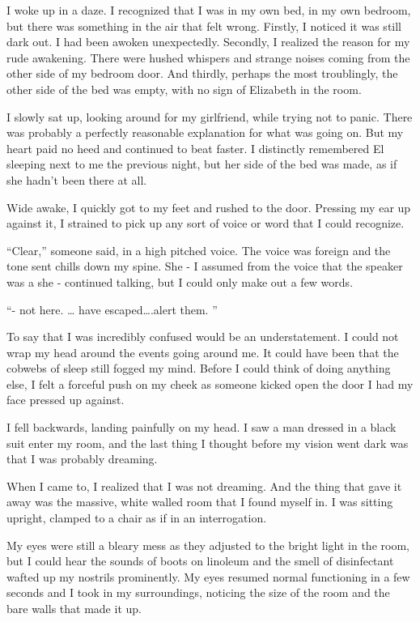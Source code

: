 I woke up in a daze. I recognized that I was in my own bed, in my own bedroom, but there was something  in the air that felt wrong. Firstly, I noticed it was still dark out. I had been awoken unexpectedly. Secondly, I realized the reason for my rude awakening. There were hushed whispers and strange noises coming from the other side of my bedroom door. And thirdly, perhaps the most troublingly, the other side of the bed was empty, with no sign of Elizabeth in the room.

I slowly sat up, looking around for my girlfriend, while trying not to panic. There was probably a perfectly reasonable explanation for what was going on. But my heart paid no heed and continued to beat faster. I distinctly remembered El sleeping next to me the previous night, but her side of the bed was made, as if she hadn’t been there at all. 

Wide awake, I quickly got to my feet and rushed to the door. Pressing my ear up against it, I strained to pick up any sort of voice or word that I could recognize. 

“Clear,” someone said, in a high pitched voice. The voice was foreign and the tone sent chills down my spine. She - I assumed from the voice that the speaker was a she - continued talking, but I could only make out a few words. 

“- not here. … have escaped….alert them. ”

To say that I was incredibly confused would be an understatement. I could not wrap my head around the events going around me. It could have been that the cobwebs of sleep still fogged my mind. Before I could think of doing anything else, I felt a forceful push on my cheek as someone kicked open the door I had my face pressed up against. 

I fell backwards, landing painfully on my head. I saw a man dressed in a black suit enter my room, and the last thing I thought before my vision went dark was that I was probably dreaming.




When I came to, I realized that I was not dreaming. And the thing that gave it away was the massive, white walled room that I found myself in. I was sitting upright, clamped to a chair as if in an interrogation.

My eyes were still a bleary mess as they adjusted to the bright light in the room, but I could hear the sounds of boots on linoleum and the smell of disinfectant wafted up my nostrils prominently. My eyes resumed normal functioning in a few seconds and I took in my surroundings, noticing the size of the room and the bare walls that made it up.

